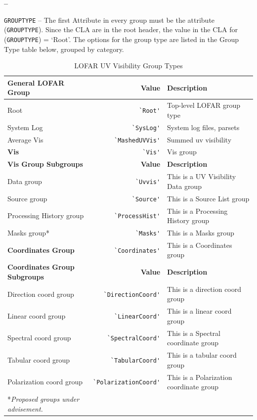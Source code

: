 \documentclass[a4paper,10pt,bibtotoc]{scrartcl}
\begin{document}
\begin{list}{\textbf{--}}{}
\item  \verb|GROUPTYPE| -- The first Attribute in every group must be
  the attribute (\verb|GROUPTYPE|).  Since the CLA are in the root
  header, the value in the CLA for (\verb|GROUPTYPE|) = `Root'.  The
  options for the group type are listed in the Group Type table below,
  grouped by category.
\begin{table}[ht]
  \centering
  \begin{tabular}{|lrp{6cm}|} 
    \hline
    \sc \textbf{General LOFAR Group} & \sc \textbf{Value} & \textbf{Description} \\
    \hline
    Root            & \verb|`Root'|              & Top-level LOFAR group type \\
    System Log & \verb|`SysLog'|          & System log files, parsets \\
    Average Vis & \verb|`MashedUVVis'|& Summed uv visibility\\
   \textbf{Vis}  & \verb|`Vis'|                & Vis group \\
    \hline \hline
    \sc \textbf{Vis Group Subgroups} & \textbf{Value} & \textbf{Description} \\
    \hline
    Data group  & \verb|`Uvvis'| & This is a UV Visibility Data group \\
    Source group & \verb|`Source'| & This is a Source List group \\
    Processing History group &\verb|`ProcessHist'| & This is a Processing History group \\
    Masks group* & \verb|`Masks'| & This is a Masks group \\
    \textbf{Coordinates Group} & \verb|`Coordinates'| & This is a Coordinates group \\
    \hline
    \sc \textbf{Coordinates Group Subgroups} & \textbf{Value} & \textbf{Description} \\
    \hline
    Direction coord group &\verb|`DirectionCoord'|& This is a direction coord group \\
    Linear coord group      &\verb|`LinearCoord'|      & This is a linear coord group \\
    Spectral coord group   &\verb|`SpectralCoord'|  & This is a Spectral coordinate group \\
    Tabular coord group    &\verb|`TabularCoord'|    & This is a tabular coord group \\
    Polarization coord group     &\verb|`PolarizationCoord'|      & This is a Polarization coordinate group \\
    \hline
     *\textit{Proposed groups under advisement.} & & \\\hline \hline
   \end{tabular}
  \label{tab:group type}
  \caption{LOFAR UV Visibility Group Types}
\end{table}
\end{list}
\end{document}
